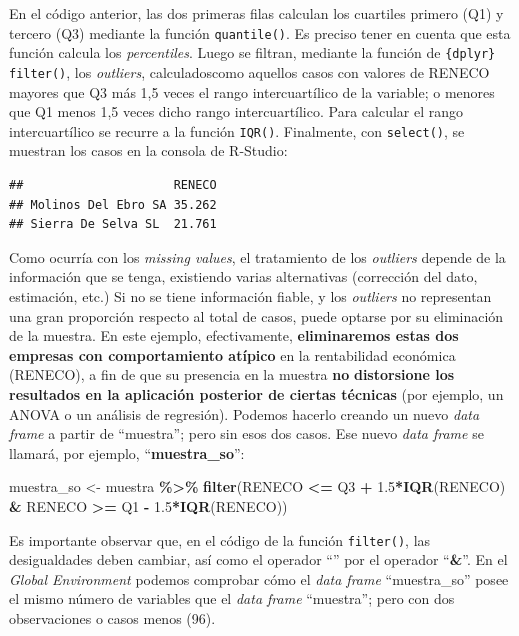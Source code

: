 \documentclass[
]{book}
\newenvironment{Shaded}{\begin{snugshade}}{\end{snugshade}}
\newcommand{\FloatTok}[1]{\textcolor[rgb]{0.00,0.00,0.81}{#1}}
\newcommand{\FunctionTok}[1]{\textcolor[rgb]{0.13,0.29,0.53}{\textbf{#1}}}
\newcommand{\NormalTok}[1]{#1}
\newcommand{\OtherTok}[1]{\textcolor[rgb]{0.56,0.35,0.01}{#1}}
\newcommand{\SpecialCharTok}[1]{\textcolor[rgb]{0.81,0.36,0.00}{\textbf{#1}}}
\begin{document}
En el código anterior, las dos primeras filas calculan los cuartiles primero (Q1) y tercero (Q3) mediante la función \texttt{quantile()}. Es preciso tener en cuenta que esta función calcula los \emph{percentiles}. Luego se filtran, mediante la función de \texttt{\{dplyr\}} \texttt{filter()}, los \emph{outliers}, calculadoscomo aquellos casos con valores de RENECO mayores que Q3 más 1,5 veces el rango intercuartílico de la variable; o menores que Q1 menos 1,5 veces dicho rango intercuartílico. Para calcular el rango intercuartílico se recurre a la función \texttt{IQR()}. Finalmente, con \texttt{select()}, se muestran los casos en la consola de R-Studio:

\begin{verbatim}
##                     RENECO
## Molinos Del Ebro SA 35.262
## Sierra De Selva SL  21.761
\end{verbatim}

Como ocurría con los \emph{missing values}, el tratamiento de los \emph{outliers} depende de la información que se tenga, existiendo varias alternativas (corrección del dato, estimación, etc.) Si no se tiene información fiable, y los \emph{outliers} no representan una gran proporción respecto al total de casos, puede optarse por su eliminación de la muestra. En este ejemplo, efectivamente, \textbf{eliminaremos estas dos empresas con comportamiento atípico} en la rentabilidad económica (RENECO), a fin de que su presencia en la muestra \textbf{no} \textbf{distorsione los resultados en la aplicación posterior de ciertas técnicas} (por ejemplo, un ANOVA o un análisis de regresión). Podemos hacerlo creando un nuevo \emph{data frame} a partir de ``muestra''; pero sin esos dos casos. Ese nuevo \emph{data frame} se llamará, por ejemplo, ``\textbf{muestra\_so}'':

\begin{Shaded}
\begin{Highlighting}[]
\NormalTok{muestra\_so }\OtherTok{\textless{}{-}}\NormalTok{ muestra }\SpecialCharTok{\%\textgreater{}\%}
            \FunctionTok{filter}\NormalTok{(RENECO }\SpecialCharTok{\textless{}=}\NormalTok{ Q3 }\SpecialCharTok{+} \FloatTok{1.5}\SpecialCharTok{*}\FunctionTok{IQR}\NormalTok{(RENECO) }\SpecialCharTok{\&}\NormalTok{ RENECO }\SpecialCharTok{\textgreater{}=}\NormalTok{ Q1 }\SpecialCharTok{{-}} \FloatTok{1.5}\SpecialCharTok{*}\FunctionTok{IQR}\NormalTok{(RENECO))}
\end{Highlighting}
\end{Shaded}

Es importante observar que, en el código de la función \texttt{filter()}, las desigualdades deben cambiar, así como el operador ``\textbf{\textbar{}}'' por el operador ``\textbf{\&}''. En el \emph{Global Environment} podemos comprobar cómo el \emph{data frame} ``muestra\_so'' posee el mismo número de variables que el \emph{data frame} ``muestra''; pero con dos observaciones o casos menos (96).
\end{document}
